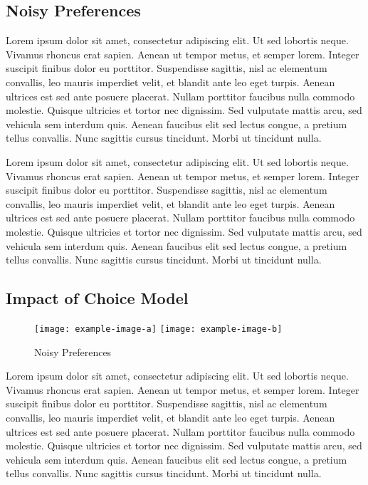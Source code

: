 \subsection{Noisy Preferences}
Lorem ipsum dolor sit amet, consectetur adipiscing elit. Ut sed lobortis neque. Vivamus rhoncus erat sapien. Aenean ut tempor metus, et semper lorem. Integer suscipit finibus dolor eu porttitor. Suspendisse sagittis, nisl ac elementum convallis, leo mauris imperdiet velit, et blandit ante leo eget turpis. Aenean ultrices est sed ante posuere placerat. Nullam porttitor faucibus nulla commodo molestie. Quisque ultricies et tortor nec dignissim. Sed vulputate mattis arcu, sed vehicula sem interdum quis. Aenean faucibus elit sed lectus congue, a pretium tellus convallis. Nunc sagittis cursus tincidunt. Morbi ut tincidunt nulla.

Lorem ipsum dolor sit amet, consectetur adipiscing elit. Ut sed lobortis neque. Vivamus rhoncus erat sapien. Aenean ut tempor metus, et semper lorem. Integer suscipit finibus dolor eu porttitor. Suspendisse sagittis, nisl ac elementum convallis, leo mauris imperdiet velit, et blandit ante leo eget turpis. Aenean ultrices est sed ante posuere placerat. Nullam porttitor faucibus nulla commodo molestie. Quisque ultricies et tortor nec dignissim. Sed vulputate mattis arcu, sed vehicula sem interdum quis. Aenean faucibus elit sed lectus congue, a pretium tellus convallis. Nunc sagittis cursus tincidunt. Morbi ut tincidunt nulla.


\subsection{Impact of Choice Model}
\begin{figure*}
    \centering 
    \texttt{[image: example-image-a]}
    \texttt{[image: example-image-b]}

    \caption{Noisy Preferences}
\end{figure*}

Lorem ipsum dolor sit amet, consectetur adipiscing elit. Ut sed lobortis neque. Vivamus rhoncus erat sapien. Aenean ut tempor metus, et semper lorem. Integer suscipit finibus dolor eu porttitor. Suspendisse sagittis, nisl ac elementum convallis, leo mauris imperdiet velit, et blandit ante leo eget turpis. Aenean ultrices est sed ante posuere placerat. Nullam porttitor faucibus nulla commodo molestie. Quisque ultricies et tortor nec dignissim. Sed vulputate mattis arcu, sed vehicula sem interdum quis. Aenean faucibus elit sed lectus congue, a pretium tellus convallis. Nunc sagittis cursus tincidunt. Morbi ut tincidunt nulla.

